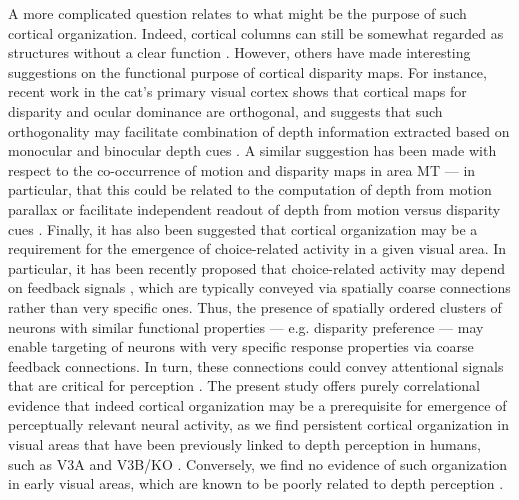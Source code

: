 A more complicated question relates to what might be the purpose of such cortical organization. Indeed, cortical columns can still be somewhat regarded as structures without a clear function \cite{Horton:2005hb}. However, others have made interesting suggestions on the functional purpose of cortical disparity maps. For instance, recent work in the cat's primary visual cortex shows that cortical maps for disparity and ocular dominance are orthogonal, and suggests that such orthogonality may facilitate combination of depth information extracted based on monocular and binocular depth cues \cite{Kara:2009fk}. A similar suggestion has been made with respect to the co-occurrence of motion and disparity maps in area MT --- in particular, that this could be related to the computation of depth from motion parallax \cite{DeAngelis:1999fk} or facilitate independent readout of depth from motion versus disparity cues \cite{Smolyanskaya:2013gw}. Finally, it has also been suggested that cortical organization may be a requirement for the emergence of choice-related activity in a given visual area. In particular, it has been recently proposed that choice-related activity may depend on feedback signals \cite{Nienborg:2009nb}, which are typically conveyed via spatially coarse connections rather than very specific ones. Thus, the presence of spatially ordered clusters of neurons with similar functional properties --- e.g. disparity preference --- may enable targeting of neurons with very specific response properties via coarse feedback connections. In turn, these connections could convey attentional signals that are critical for perception \cite{Nienborg:2014fu}. The present study offers purely correlational evidence that indeed cortical organization may be a prerequisite for emergence of perceptually relevant neural activity, as we find persistent cortical organization in visual areas that have been previously linked to depth perception in humans, such as V3A and V3B/KO \cite{Backus:2001ly,Tsao:2003lk,Preston:2008dg,Ban:2015cr}. Conversely, we find no evidence of such organization in early visual areas, which are known to be poorly related to depth perception \cite{Cumming:1999zr,Preston:2008dg}.

